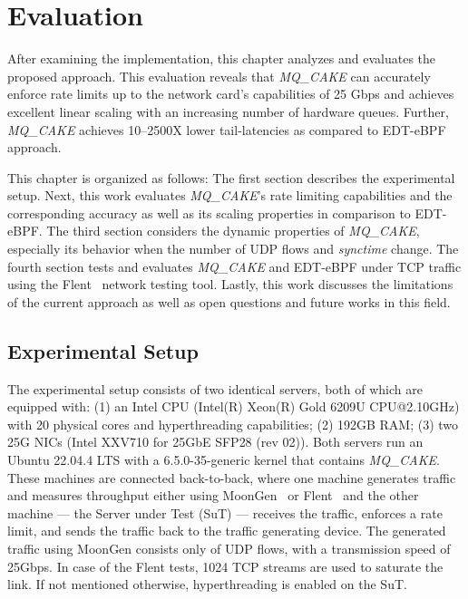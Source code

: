 \section{Evaluation}\label{sec:evaluation}
After examining the implementation, this chapter analyzes and evaluates the proposed approach.
%
This evaluation reveals that \textit{MQ\_CAKE} can accurately enforce rate limits up to the network card's capabilities of 25 Gbps and achieves excellent linear scaling with an increasing number of hardware queues.
%
Further, \textit{MQ\_CAKE} achieves 10--2500X lower tail-latencies as compared to EDT-eBPF approach.

This chapter is organized as follows:
%
The first section describes the experimental setup. 
%
Next, this work evaluates \textit{MQ\_CAKE}'s rate limiting capabilities and the corresponding accuracy as well as its scaling properties in comparison to EDT-eBPF.
%
The third section considers the dynamic properties of \textit{MQ\_CAKE}, especially its behavior when the number of UDP flows and \textit{synctime} change.
%
The fourth section tests and evaluates \textit{MQ\_CAKE} and EDT-eBPF under TCP traffic using the Flent~\cite{flent} network testing tool.
%
Lastly, this work discusses the limitations of the current approach as well as open questions and future works in this field.

\subsection{Experimental Setup}
The experimental setup consists of two identical servers, both of which are equipped with: 
(1) an Intel CPU (Intel(R) Xeon(R) Gold 6209U CPU@2.10GHz) with 20 physical cores and hyperthreading capabilities;
(2) 192GB RAM;
(3) two 25G NICs (Intel XXV710 for 25GbE SFP28 (rev 02)).
Both servers run an Ubuntu 22.04.4 LTS with a 6.5.0-35-generic kernel that contains \textit{MQ\_CAKE}. 
These machines are connected back-to-back, where one machine generates traffic and measures throughput either using MoonGen~\cite{moongen} or Flent~\cite{flent} and the other machine --- the Server under Test (SuT) --- receives the traffic, enforces a rate limit, and sends the traffic back to the traffic generating device.
%
The generated traffic using MoonGen consists only of UDP flows, with a transmission speed of 25Gbps.
%
In case of the Flent tests, 1024 TCP streams are used to saturate the link.
%
If not mentioned otherwise, hyperthreading is enabled on the SuT.

